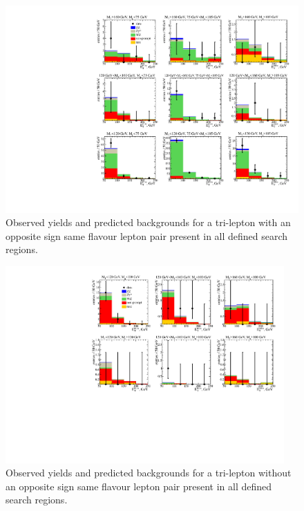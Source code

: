 \begin{figure}[htp]
\begin{center}
\includegraphics[width=1.0\textwidth]{plots/ossf1tau0.pdf}
\caption{Observed yields and predicted backgrounds for a tri-lepton with an opposite sign same flavour lepton pair present in all defined search regions.}
\label{fig:OSSF1tau0}
\end{center}
\end{figure}
\begin{figure}[htp]
\begin{center}
\includegraphics[width=0.95\textwidth]{plots/ossf0tau0.pdf}
\caption{Observed yields and predicted backgrounds for a tri-lepton without an opposite sign same flavour lepton pair present in all defined search regions.}
\label{fig:OSSF0tau0}
\end{center}
\end{figure}

